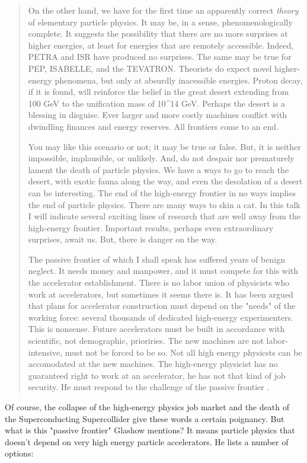 \begin{quote}
     On the other hand, we have for the first time an apparently 
     correct \emph{theory} of elementary particle physics.  It may be, in
     a sense, phenomenologically complete.  It suggests the possibility
     that there are no more surprises at higher energies, at least for
     energies that are remotely accessible.  Indeed, PETRA and ISR have
     produced no surprises.  The same may be true for PEP, ISABELLE, and
     the TEVATRON.  Theorists do expect novel higher-energy phenomena,
     but only at absurdly inacessible energies.  Proton decay, if it is 
     found, will reinforce the belief in the great desert extending from
     100 GeV to the unification mass of 10^{14} GeV.  Perhaps 
     the desert
     is a blessing in disguise.  Ever larger and more costly machines
     conflict with dwindling finances and energy reserves.  All frontiers
     come to an end.  

     You may like this scenario or not; it may be true or false.  But,
     it is neither impossible, implausible, or unlikely.  And, do not 
     despair nor prematurely lament the death of particle physics.  We
     have a ways to go to reach the desert, with exotic fauna along the
     way, and even the desolation of a desert can be interesting.  The
     end of the high-energy frontier in no ways implies the end of 
     particle physics.  There are many ways to skin a cat.  In this talk
     I will indicate several exciting lines of research that are well 
     away from the high-energy frontier.  Important results, perhaps even
     extraordinary surprises, await us.  But, there is danger on the way.

     The passive frontier of which I shall speak has suffered years of
     benign neglect.  It needs money and manpower, and it must compete
     for this with the accelerator establishment.  There is no labor
     union of physicists who work at accelerators, but sometimes it seems
     there is.  It has been argued that plans for accelerator construction
     must depend on the "needs" of the working force: several thousands
     of dedicated high-energy experimenters.  This is nonsense.  Future
     accelerators must be built in accordance with scientific, not 
     demographic, prioriries.  The new machines are not labor-intensive, 
     must not be forced to be so.  Not all high energy physicsts can be
     accomodated at the new machines.  The high-energy physicist has no
     guaranteed right to work at an accelerator, he has not that kind of
     job security.  He must respond to the challenge of the passive
     frontier
.
\end{quote}
Of course, the collapse of the high-energy physics job market and the
death of the Superconducting Supercollider give these words a certain
poignancy.  But what is this "passive frontier" Glashow mentions?  It
means particle physics that doesn't depend on very high energy particle
accelerators.  He lists a number of options:

